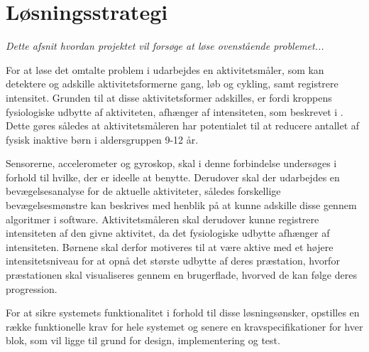 \section{Løsningsstrategi}
\textit{Dette afsnit hvordan projektet vil forsøge at løse ovenstående problemet...}

For at løse det omtalte problem i  udarbejdes en aktivitetsmåler, som kan detektere og adskille aktivitetsformerne gang, løb og cykling, samt registrere intensitet. Grunden til at disse aktivitetsformer adskilles, er fordi kroppens fysiologiske udbytte af aktiviteten, afhænger af intensiteten, som beskrevet i . Dette gøres således at aktivitetsmåleren har potentialet til at reducere antallet af fysisk inaktive børn i aldersgruppen 9-12 år.

Sensorerne, accelerometer og gyroskop, skal i denne forbindelse undersøges i forhold til hvilke, der er ideelle at benytte. Derudover skal der udarbejdes en bevægelsesanalyse for de aktuelle aktiviteter, således forskellige bevægelsesmønstre kan beskrives med henblik på at kunne adskille disse gennem algoritmer i software. Aktivitetsmåleren skal derudover kunne registrere intensiteten af den givne aktivitet, da det fysiologiske udbytte afhænger af intensiteten. Børnene skal derfor motiveres til at være aktive med et højere intensitetsniveau for at opnå det største udbytte af deres præstation, hvorfor præstationen skal visualiseres gennem en brugerflade, hvorved de kan følge deres progression.

For at sikre systemets funktionalitet i forhold til disse løsningsønsker, opstilles en række funktionelle krav for hele systemet og senere en kravspecifikationer for hver blok, som vil ligge til grund for design, implementering og test. 




